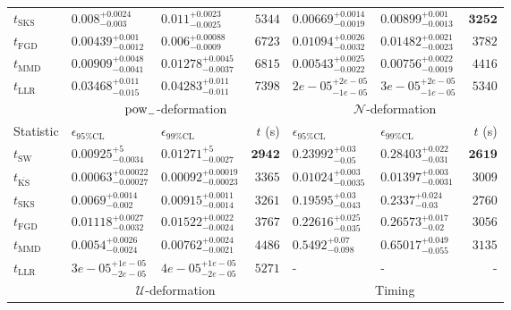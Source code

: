 \begin{tabular}{l|llr|llr}
	$t_{\mathrm{SKS}}$ & $0.008_{-0.003}^{+0.0024}$ & $0.011_{-0.0025}^{+0.0023}$ & $5344$ & $0.00669_{-0.0019}^{+0.0014}$ & $0.00899_{-0.0013}^{+0.001}$ & ${\mathbf{3252}}$ \\
	$t_{\mathrm{FGD}}$ & ${\mathbf{0.00439_{-0.0012}^{+0.001}}}$ & ${\mathbf{0.006_{-0.0009}^{+0.00088}}}$ & $6723$ & $0.01094_{-0.0032}^{+0.0026}$ & $0.01482_{-0.0023}^{+0.0021}$ & $3782$ \\
	$t_{\mathrm{MMD}}$ & $0.00909_{-0.0041}^{+0.0048}$ & $0.01278_{-0.0037}^{+0.0045}$ & $6815$ & $0.00543_{-0.0022}^{+0.0025}$ & $0.00756_{-0.0019}^{+0.0022}$ & $4416$ \\
	$t_{\mathrm{LLR}}$ & $0.03468_{-0.015}^{+0.011}$ & $0.04283_{-0.011}^{+0.011}$ & $7398$ & $2e-05_{-1e-05}^{+2e-05}$ & $3e-05_{-1e-05}^{+2e-05}$ & $5340$ \\
	\toprule
	\multicolumn{1}{c}{} & \multicolumn{3}{c}{$\rm{pow}_{-}$-deformation} & \multicolumn{3}{c}{$\mathcal{N}$-deformation} \\
	Statistic & $\epsilon_{95\%\mathrm{CL}}$ & $\epsilon_{99\%\mathrm{CL}}$ & $t$ (s) & $\epsilon_{95\%\mathrm{CL}}$ & $\epsilon_{99\%\mathrm{CL}}$ & $t$ (s) \\
	\midrule
	$t_{\mathrm{SW}}$ & $0.00925_{-0.0034}^{+5}$ & $0.01271_{-0.0027}^{+5}$ & ${\mathbf{2942}}$ & $0.23992_{-0.05}^{+0.03}$ & $0.28403_{-0.031}^{+0.022}$ & ${\mathbf{2619}}$ \\
	$t_{\overline{\mathrm{KS}}}$ & ${\mathbf{0.00063_{-0.00027}^{+0.00022}}}$ & ${\mathbf{0.00092_{-0.00023}^{+0.00019}}}$ & $3365$ & ${\mathbf{0.01024_{-0.0035}^{+0.003}}}$ & ${\mathbf{0.01397_{-0.0031}^{+0.003}}}$ & $3009$ \\
	$t_{\mathrm{SKS}}$ & $0.0069_{-0.002}^{+0.0014}$ & $0.00915_{-0.0014}^{+0.0011}$ & $3261$ & $0.19595_{-0.043}^{+0.03}$ & $0.2337_{-0.03}^{+0.024}$ & $2760$ \\
	$t_{\mathrm{FGD}}$ & $0.01118_{-0.0032}^{+0.0027}$ & $0.01522_{-0.0024}^{+0.0022}$ & $3767$ & $0.22616_{-0.035}^{+0.025}$ & $0.26573_{-0.02}^{+0.017}$ & $3056$ \\
	$t_{\mathrm{MMD}}$ & $0.0054_{-0.0024}^{+0.0026}$ & $0.00762_{-0.0021}^{+0.0024}$ & $4486$ & $0.5492_{-0.098}^{+0.07}$ & $0.65017_{-0.055}^{+0.049}$ & $3135$ \\
	$t_{\mathrm{LLR}}$ & $3e-05_{-2e-05}^{+1e-05}$ & $4e-05_{-2e-05}^{+1e-05}$ & $5271$ & - & - & - \\
	\toprule
	\multicolumn{1}{c}{} & \multicolumn{3}{c}{$\mathcal{U}$-deformation} & \multicolumn{3}{c}{Timing} \\

\end{tabular}
